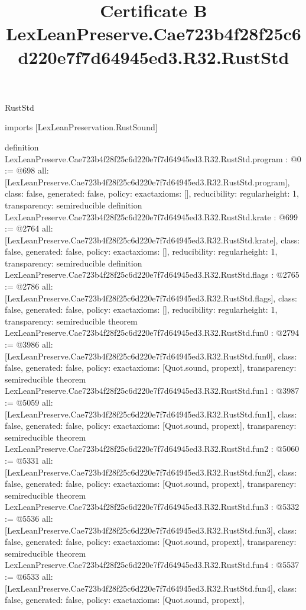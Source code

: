 \begin{lexlean}{RustStd}
\title{Certificate B LexLeanPreserve.Cae723b4f28f25c6d220e7f7d64945ed3.R32.RustStd}
\begin{coremodule}
imports [LexLeanPreservation.RustSound]

definition LexLeanPreserve.Cae723b4f28f25c6d220e7f7d64945ed3.R32.RustStd.program : @0 := @698 {
  all: [LexLeanPreserve.Cae723b4f28f25c6d220e7f7d64945ed3.R32.RustStd.program],
  class: false,
  generated: false,
  policy: exact{axioms: []},
  reducibility: regular{height: 1},
  transparency: semireducible
}
definition LexLeanPreserve.Cae723b4f28f25c6d220e7f7d64945ed3.R32.RustStd.krate : @699 := @2764 {
  all: [LexLeanPreserve.Cae723b4f28f25c6d220e7f7d64945ed3.R32.RustStd.krate],
  class: false,
  generated: false,
  policy: exact{axioms: []},
  reducibility: regular{height: 1},
  transparency: semireducible
}
definition LexLeanPreserve.Cae723b4f28f25c6d220e7f7d64945ed3.R32.RustStd.flags : @2765 := @2786 {
  all: [LexLeanPreserve.Cae723b4f28f25c6d220e7f7d64945ed3.R32.RustStd.flags],
  class: false,
  generated: false,
  policy: exact{axioms: []},
  reducibility: regular{height: 1},
  transparency: semireducible
}
theorem LexLeanPreserve.Cae723b4f28f25c6d220e7f7d64945ed3.R32.RustStd.fun0 : @2794 := @3986 {
  all: [LexLeanPreserve.Cae723b4f28f25c6d220e7f7d64945ed3.R32.RustStd.fun0],
  class: false,
  generated: false,
  policy: exact{axioms: [Quot.sound, propext]},
  transparency: semireducible
}
theorem LexLeanPreserve.Cae723b4f28f25c6d220e7f7d64945ed3.R32.RustStd.fun1 : @3987 := @5059 {
  all: [LexLeanPreserve.Cae723b4f28f25c6d220e7f7d64945ed3.R32.RustStd.fun1],
  class: false,
  generated: false,
  policy: exact{axioms: [Quot.sound, propext]},
  transparency: semireducible
}
theorem LexLeanPreserve.Cae723b4f28f25c6d220e7f7d64945ed3.R32.RustStd.fun2 : @5060 := @5331 {
  all: [LexLeanPreserve.Cae723b4f28f25c6d220e7f7d64945ed3.R32.RustStd.fun2],
  class: false,
  generated: false,
  policy: exact{axioms: [Quot.sound, propext]},
  transparency: semireducible
}
theorem LexLeanPreserve.Cae723b4f28f25c6d220e7f7d64945ed3.R32.RustStd.fun3 : @5332 := @5536 {
  all: [LexLeanPreserve.Cae723b4f28f25c6d220e7f7d64945ed3.R32.RustStd.fun3],
  class: false,
  generated: false,
  policy: exact{axioms: [Quot.sound, propext]},
  transparency: semireducible
}
theorem LexLeanPreserve.Cae723b4f28f25c6d220e7f7d64945ed3.R32.RustStd.fun4 : @5537 := @6533 {
  all: [LexLeanPreserve.Cae723b4f28f25c6d220e7f7d64945ed3.R32.RustStd.fun4],
  class: false,
  generated: false,
  policy: exact{axioms: [Quot.sound, propext]},
}
\end{coremodule}
\end{lexlean}
